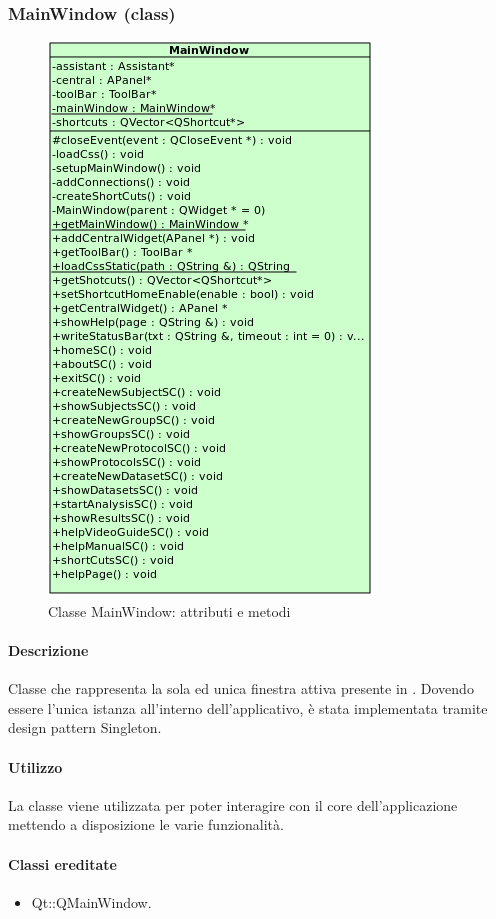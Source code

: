 \subsubsection{MainWindow (class)}
\label{speMainWindow}
\begin{figure}[!h]
\centering
			\includegraphics[width=0.4\linewidth]{./Content/Immagini/view/MainWindow.png}
			\caption{Classe MainWindow: attributi e metodi}
			\label{cl_mainWind}
\end{figure}
\paragraph{Descrizione \\}
Classe che rappresenta la sola ed unica finestra attiva presente in \project{}. Dovendo essere l'unica istanza all'interno dell'applicativo, è stata implementata tramite design pattern\g{} Singleton.
\paragraph{Utilizzo\\}
La classe viene utilizzata per poter interagire con il core dell'applicazione mettendo a disposizione le varie funzionalità.
\paragraph{Classi ereditate\\}
\begin{itemize}
\item Qt::QMainWindow.
\end{itemize}
